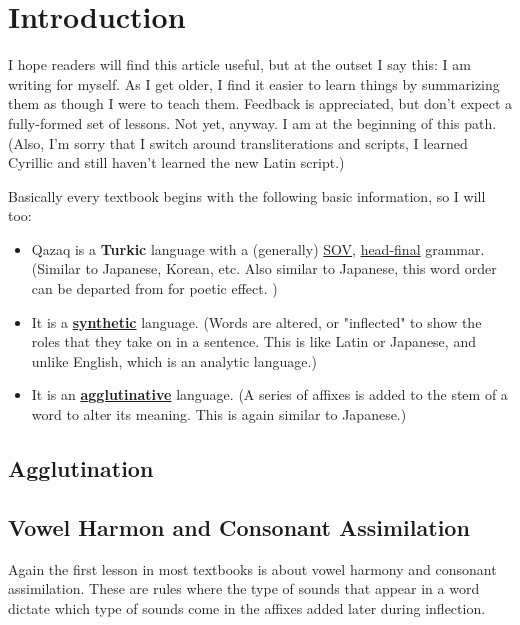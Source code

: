 \documentclass[main.tex]{subfiles}
\begin{document}
\chapter{Introduction}

I hope readers will find this article useful, but at the outset I say this: I am writing for myself. As I get older, I find it easier to learn things by summarizing them as though I were to teach them. Feedback is appreciated, but don't expect a fully-formed set of lessons. Not yet, anyway. I am at the beginning of this path.
(Also, I'm sorry that I switch around transliterations and scripts, I learned Cyrillic and still haven't learned the new Latin script.)

Basically every textbook begins with the following basic information, so I will too:
\begin{itemize}
	\item Qazaq is a \textbf{Turkic} language with a (generally) \href{https://en.wikipedia.org/wiki/Subject-object-verb_word_order}{SOV}, \href{https://en.wikipedia.org/wiki/Head-directionality_parameter}{head-final} grammar.(Similar to Japanese, Korean, etc. Also similar to Japanese, this word order can be departed from for poetic effect. )
	
	\item It is a \href{https://en.wikipedia.org/wiki/Synthetic_language}{\textbf{synthetic}} language. (Words are altered, or "inflected" to show the roles that they take on in a sentence. This is like Latin or Japanese, and unlike English, which is an analytic language.)
	
	\item It is an \href{https://en.wikipedia.org/wiki/Agglutinative_language}{\textbf{agglutinative}} language. (A series of affixes is added to the stem of a word to alter its meaning. This is again similar to Japanese.)
\end{itemize}

\section{Agglutination}

\section{Vowel Harmon and Consonant Assimilation}
Again the first lesson in most textbooks is about vowel harmony and consonant assimilation. These are rules where the type of sounds that appear in a word dictate which type of sounds come in the affixes added later during inflection.
\end{document}
